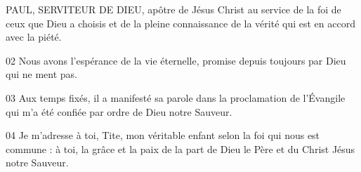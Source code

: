 PAUL, SERVITEUR DE DIEU, apôtre de Jésus Christ au service de la foi de ceux que Dieu a choisis et de la pleine connaissance de la vérité qui est en accord avec la piété.

02 Nous avons l’espérance de la vie éternelle, promise depuis toujours par Dieu qui ne ment pas.

03 Aux temps fixés, il a manifesté sa parole dans la proclamation de l’Évangile qui m’a été confiée par ordre de Dieu notre Sauveur.

04 Je m’adresse à toi, Tite, mon véritable enfant selon la foi qui nous est commune : à toi, la grâce et la paix de la part de Dieu le Père et du Christ Jésus notre Sauveur.
